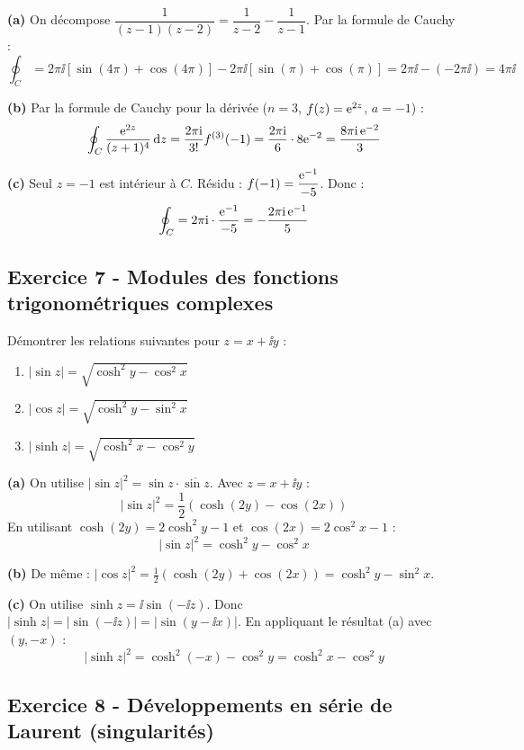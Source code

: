 \documentclass[12pt,a4paper]{article}
\begin{document}
\begin{boitecorrige}
\textbf{(a)} On décompose $\dfrac{1}{(z-1)(z-2)} = \dfrac{1}{z-2} - \dfrac{1}{z-1}$. Par la formule de Cauchy :
\[
\oint_C = 2\pi\ii[\sin(4\pi)+\cos(4\pi)] - 2\pi\ii[\sin(\pi)+\cos(\pi)] = 2\pi\ii - (-2\pi\ii) = 4\pi\ii
\]

\textbf{(b)} Par la formule de Cauchy pour la dérivée ($n=3$, $f(z)=\mathrm{e}^{2z}$, $a=-1$) :
\[
\oint_C \frac{\mathrm{e}^{2z}}{(z+1)^4}\,\mathrm{d} z = \frac{2\pi\mathrm{i}}{3!}f^{(3)}(-1) = \frac{2\pi\mathrm{i}}{6}\cdot 8\mathrm{e}^{-2} = \frac{8\pi\mathrm{i}\,\mathrm{e}^{-2}}{3}
\]

\textbf{(c)} Seul $z=-1$ est intérieur à $C$. Résidu : $f(-1) = \dfrac{\mathrm{e}^{-1}}{-5}$. Donc :
\[
\oint_C = 2\pi\mathrm{i}\cdot\frac{\mathrm{e}^{-1}}{-5} = -\frac{2\pi\mathrm{i}\,\mathrm{e}^{-1}}{5}
\]
\end{boitecorrige}

\subsection*{Exercice 7 - Modules des fonctions trigonométriques complexes \niveau{\moyen}}

\begin{boiteexercice}
Démontrer les relations suivantes pour $z = x+\ii y$ :
\begin{enumerate}[label=(\alph*)]
  \item $|\sin z| = \sqrt{\cosh^2 y - \cos^2 x}$
  \item $|\cos z| = \sqrt{\cosh^2 y - \sin^2 x}$
  \item $|\sinh z| = \sqrt{\cosh^2 x - \cos^2 y}$
\end{enumerate}
\end{boiteexercice}

\begin{boitecorrige}
\textbf{(a)} On utilise $|\sin z|^2 = \sin z\cdot\overline{\sin z}$. Avec $z=x+\ii y$ :
\[
|\sin z|^2 = \frac{1}{2}(\cosh(2y)-\cos(2x))
\]
En utilisant $\cosh(2y)=2\cosh^2 y-1$ et $\cos(2x)=2\cos^2 x-1$ :
\[
|\sin z|^2 = \cosh^2 y - \cos^2 x
\]

\textbf{(b)} De même : $|\cos z|^2 = \frac{1}{2}(\cosh(2y)+\cos(2x)) = \cosh^2 y - \sin^2 x$.

\textbf{(c)} On utilise $\sinh z = \ii\sin(-\ii z)$. Donc $|\sinh z| = |\sin(-\ii z)| = |\sin(y-\ii x)|$. En appliquant le résultat (a) avec $(y,-x)$ :
\[
|\sinh z|^2 = \cosh^2(-x) - \cos^2 y = \cosh^2 x - \cos^2 y
\]
\end{boitecorrige}

\subsection*{Exercice 8 - Développements en série de Laurent (singularités) \niveau{\moyen}}
\end{document}

